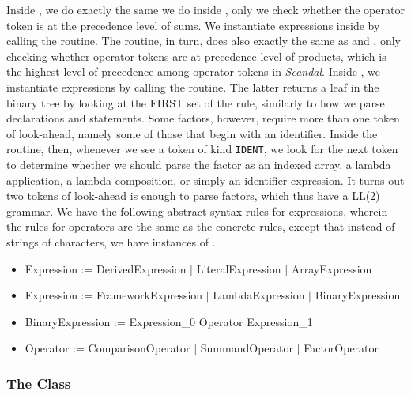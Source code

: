 Inside , we do exactly the same we do inside , only we check whether the operator token is at the precedence level of sums. We instantiate expressions inside  by calling the  routine. The  routine, in turn, does also exactly the same as  and , only checking whether operator tokens are at precedence level of products, which is the highest level of precedence among operator tokens in \emph{Scandal}. Inside , we instantiate expressions by calling the  routine. The latter returns a leaf in the binary tree by looking at the FIRST set of the  rule, similarly to how we parse declarations and statements. Some factors, however, require more than one token of look-ahead, namely some of those that begin with an identifier. Inside the  routine, then, whenever we see a token of kind \texttt{IDENT}, we look for the next token to determine whether we should parse the factor as an indexed array, a lambda application, a lambda composition, or simply an identifier expression. It turns out two tokens of look-ahead is enough to parse factors, which thus have a LL(2) grammar. We have the following abstract syntax rules for expressions, wherein the rules for operators are the same as the concrete rules, except that instead of strings of characters, we have instances of .

\begin{itemize}
	\item Expression := DerivedExpression $|$ LiteralExpression $|$ ArrayExpression
	\item Expression := FrameworkExpression $|$ LambdaExpression $|$ BinaryExpression
	\item BinaryExpression := Expression\_0 Operator Expression\_1
	\item Operator := ComparisonOperator $|$ SummandOperator $|$ FactorOperator
\end{itemize}

\subsubsection{The  Class}

